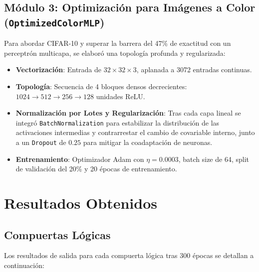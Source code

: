 \documentclass[12pt]{article}
\begin{document}
	\subsection{Módulo 3: Optimización para Imágenes a Color (\texttt{OptimizedColorMLP})}
	Para abordar CIFAR-10 y superar la barrera del 47\% de exactitud con un perceptrón multicapa, se elaboró una topología profunda y regularizada:
	\begin{itemize}
		\item \textbf{Vectorización}: Entrada de $32 \times 32 \times 3$, aplanada a 3072 entradas continuas.
		\item \textbf{Topología}: Secuencia de 4 bloques densos decrecientes: $1024 \to 512 \to 256 \to 128$ unidades ReLU.
		\item \textbf{Normalización por Lotes y Regularización}: Tras cada capa lineal se integró \texttt{BatchNormalization} para estabilizar la distribución de las activaciones intermedias y contrarrestar el cambio de covariable interno, junto a un \texttt{Dropout} de $0.25$ para mitigar la coadaptación de neuronas.
		\item \textbf{Entrenamiento}: Optimizador Adam con $\eta = 0.0003$, batch size de 64, split de validación del 20\% y 20 épocas de entrenamiento.
	\end{itemize}
	
	\section{Resultados Obtenidos}
	
	\subsection{Compuertas Lógicas}
	Los resultados de salida para cada compuerta lógica tras 300 épocas se detallan a continuación:
	
\end{document}
